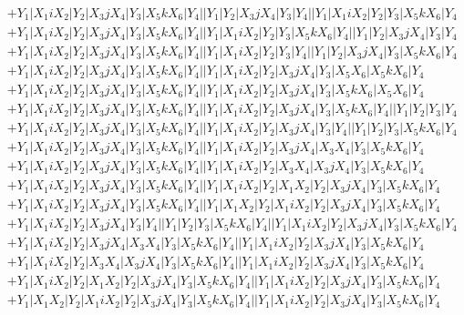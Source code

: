 \documentclass{article}[12pt]
\begin{document}
\begin{align*}
 & +Y_1|X_1iX_2|Y_2|X_3jX_4|Y_3|X_5kX_6|Y_4||Y_1|Y_2|X_3jX_4|Y_3|Y_4||Y_1|X_1iX_2|Y_2|Y_3|X_5kX_6|Y_4\\ 
 & +Y_1|X_1iX_2|Y_2|X_3jX_4|Y_3|X_5kX_6|Y_4||Y_1|X_1iX_2|Y_2|Y_3|X_5kX_6|Y_4||Y_1|Y_2|X_3jX_4|Y_3|Y_4\\ 
 & +Y_1|X_1iX_2|Y_2|X_3jX_4|Y_3|X_5kX_6|Y_4||Y_1|X_1iX_2|Y_2|Y_3|Y_4||Y_1|Y_2|X_3jX_4|Y_3|X_5kX_6|Y_4\\ 
 & +Y_1|X_1iX_2|Y_2|X_3jX_4|Y_3|X_5kX_6|Y_4||Y_1|X_1iX_2|Y_2|X_3jX_4|Y_3|X_5X_6|X_5kX_6|Y_4\\ 
 & +Y_1|X_1iX_2|Y_2|X_3jX_4|Y_3|X_5kX_6|Y_4||Y_1|X_1iX_2|Y_2|X_3jX_4|Y_3|X_5kX_6|X_5X_6|Y_4\\ 
 & +Y_1|X_1iX_2|Y_2|X_3jX_4|Y_3|X_5kX_6|Y_4||Y_1|X_1iX_2|Y_2|X_3jX_4|Y_3|X_5kX_6|Y_4||Y_1|Y_2|Y_3|Y_4\\ 
 & +Y_1|X_1iX_2|Y_2|X_3jX_4|Y_3|X_5kX_6|Y_4||Y_1|X_1iX_2|Y_2|X_3jX_4|Y_3|Y_4||Y_1|Y_2|Y_3|X_5kX_6|Y_4\\ 
 & +Y_1|X_1iX_2|Y_2|X_3jX_4|Y_3|X_5kX_6|Y_4||Y_1|X_1iX_2|Y_2|X_3jX_4|X_3X_4|Y_3|X_5kX_6|Y_4\\ 
 & +Y_1|X_1iX_2|Y_2|X_3jX_4|Y_3|X_5kX_6|Y_4||Y_1|X_1iX_2|Y_2|X_3X_4|X_3jX_4|Y_3|X_5kX_6|Y_4\\ 
 & +Y_1|X_1iX_2|Y_2|X_3jX_4|Y_3|X_5kX_6|Y_4||Y_1|X_1iX_2|Y_2|X_1X_2|Y_2|X_3jX_4|Y_3|X_5kX_6|Y_4\\ 
 & +Y_1|X_1iX_2|Y_2|X_3jX_4|Y_3|X_5kX_6|Y_4||Y_1|X_1X_2|Y_2|X_1iX_2|Y_2|X_3jX_4|Y_3|X_5kX_6|Y_4\\ 
 & +Y_1|X_1iX_2|Y_2|X_3jX_4|Y_3|Y_4||Y_1|Y_2|Y_3|X_5kX_6|Y_4||Y_1|X_1iX_2|Y_2|X_3jX_4|Y_3|X_5kX_6|Y_4\\ 
 & +Y_1|X_1iX_2|Y_2|X_3jX_4|X_3X_4|Y_3|X_5kX_6|Y_4||Y_1|X_1iX_2|Y_2|X_3jX_4|Y_3|X_5kX_6|Y_4\\ 
 & +Y_1|X_1iX_2|Y_2|X_3X_4|X_3jX_4|Y_3|X_5kX_6|Y_4||Y_1|X_1iX_2|Y_2|X_3jX_4|Y_3|X_5kX_6|Y_4\\ 
 & +Y_1|X_1iX_2|Y_2|X_1X_2|Y_2|X_3jX_4|Y_3|X_5kX_6|Y_4||Y_1|X_1iX_2|Y_2|X_3jX_4|Y_3|X_5kX_6|Y_4\\ 
 & +Y_1|X_1X_2|Y_2|X_1iX_2|Y_2|X_3jX_4|Y_3|X_5kX_6|Y_4||Y_1|X_1iX_2|Y_2|X_3jX_4|Y_3|X_5kX_6|Y_4\end{align*}
\end{document}
